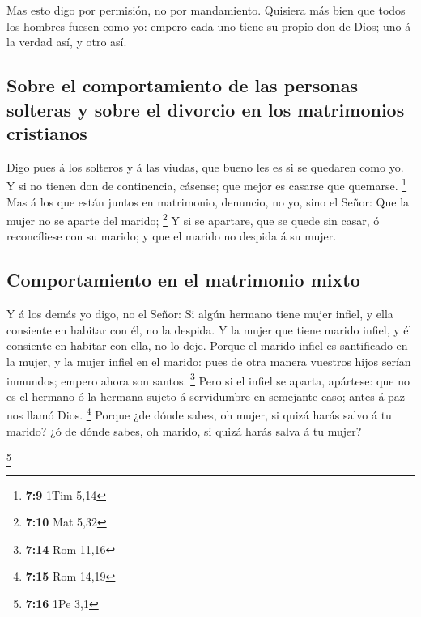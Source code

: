  Mas esto digo por permisión, no por mandamiento.
 Quisiera más bien que todos los hombres fuesen como yo:
empero cada uno tiene su propio don de Dios; uno á la verdad así, y otro
así.

\hypertarget{sobre-el-comportamiento-de-las-personas-solteras-y-sobre-el-divorcio-en-los-matrimonios-cristianos}{%
\subsection{Sobre el comportamiento de las personas solteras y sobre el
divorcio en los matrimonios
cristianos}\label{sobre-el-comportamiento-de-las-personas-solteras-y-sobre-el-divorcio-en-los-matrimonios-cristianos}}

 Digo pues á los solteros y á las viudas, que bueno les es
si se quedaren como yo.  Y si no tienen don de
continencia, cásense; que mejor es casarse que quemarse. \footnote{\textbf{7:9}
  1Tim 5,14}  Mas á los que están juntos en matrimonio,
denuncio, no yo, sino el Señor: Que la mujer no se aparte del marido;
\footnote{\textbf{7:10} Mat 5,32}  Y si se apartare, que
se quede sin casar, ó reconcíliese con su marido; y que el marido no
despida á su mujer.

\hypertarget{comportamiento-en-el-matrimonio-mixto}{%
\subsection{Comportamiento en el matrimonio
mixto}\label{comportamiento-en-el-matrimonio-mixto}}

 Y á los demás yo digo, no el Señor: Si algún hermano
tiene mujer infiel, y ella consiente en habitar con él, no la despida.
 Y la mujer que tiene marido infiel, y él consiente en
habitar con ella, no lo deje.  Porque el marido infiel es
santificado en la mujer, y la mujer infiel en el marido: pues de otra
manera vuestros hijos serían inmundos; empero ahora son santos.
\footnote{\textbf{7:14} Rom 11,16}  Pero si el infiel se
aparta, apártese: que no es el hermano ó la hermana sujeto á servidumbre
en semejante caso; antes á paz nos llamó Dios. \footnote{\textbf{7:15}
  Rom 14,19}  Porque ¿de dónde sabes, oh mujer, si quizá
harás salvo á tu marido? ¿ó de dónde sabes, oh marido, si quizá harás
salva á tu mujer?

\footnote{\textbf{7:16} 1Pe 3,1}

